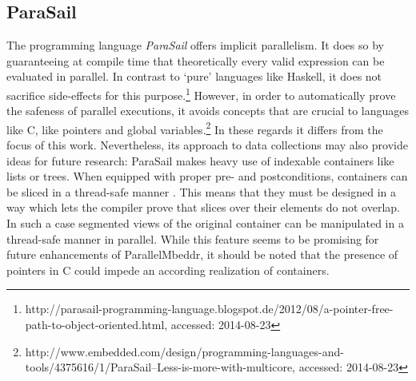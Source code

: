 \subsection{ParaSail}
The programming language \textit{ParaSail} offers implicit parallelism. It does so by guaranteeing at compile time that theoretically every valid expression can be evaluated in parallel. In contrast to `pure' languages like Haskell, it does not sacrifice side-effects for this purpose.\footnote{http://parasail-programming-language.blogspot.de/2012/08/a-pointer-free-path-to-object-oriented.html, accessed: 2014-08-23} However, in order to automatically prove the safeness of parallel executions, it avoids concepts that are crucial to languages like C, like pointers and global variables.\footnote{http://www.embedded.com/design/programming-languages-and-tools/4375616/1/ParaSail--Less-is-more-with-multicore, accessed: 2014-08-23} In these regards it differs from the focus of this work. Nevertheless, its approach to data collections may also provide ideas for future research: ParaSail makes heavy use of indexable containers like lists or trees. When equipped with proper pre- and postconditions, containers can be sliced in a thread-safe manner \cite{ParaSailReferenceManual}. This means that they must be designed in a way which lets the compiler prove that slices over their elements do not overlap. In such a case segmented views of the original container can be manipulated in a thread-safe manner in parallel. While this feature seems to be promising for future enhancements of ParallelMbeddr, it should be noted that the presence of pointers in C could impede an according realization of containers.

